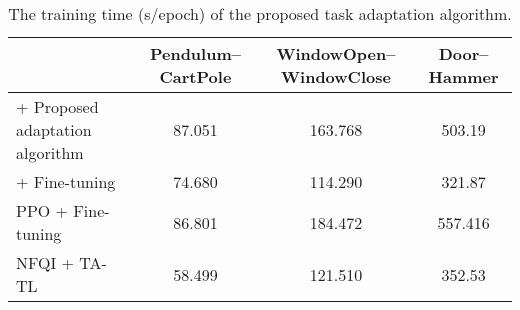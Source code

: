 \begin{landscape}
  \begin{table}[H]
    \caption{The training time (s/epoch) of the proposed task adaptation algorithm.\label{ch:DTAIL:tab:Result_Cost}}

    \centering
    \begin{tabular}{p{5.5cm}ccc}
      \toprule
                                              & \textbf{Pendulum--CartPole} & \textbf{WindowOpen--WindowClose} & \textbf{Door--Hammer} \\
      \midrule
      \DTAIL{}+ Proposed adaptation algorithm & 87.051                      & 163.768                          & 503.19                \\
      \DTAIL{}+ Fine-tuning                   & 74.680                      & 114.290                          & 321.87                \\
      PPO \cite{Baseline_PPO} + Fine-tuning   & 86.801                      & 184.472                          & 557.416               \\
      NFQI + TA-TL \cite{Baseline_TATL}       & 58.499                      & 121.510                          & 352.53                \\
      \bottomrule
    \end{tabular}
  \end{table}
\end{landscape}

